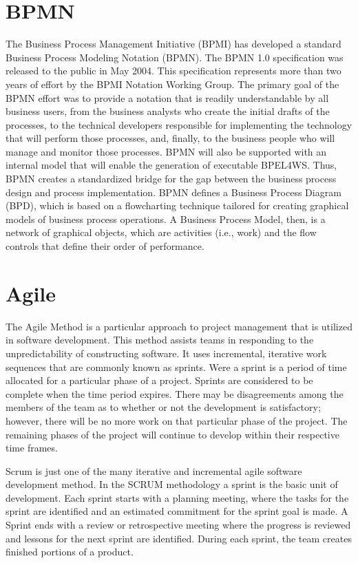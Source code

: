 \section{BPMN}
The Business Process Management Initiative (BPMI) has developed a standard
Business Process Modeling Notation (BPMN). The BPMN 1.0 specification was
released to the public in May 2004. This specification represents more than two
years of effort by the BPMI Notation Working Group. The primary goal of the BPMN
effort was to provide a notation that is readily understandable by all business
users, from the business analysts who create the initial drafts of the
processes, to the technical developers responsible for implementing the
technology that will perform those processes, and, finally, to the business
people who will manage and monitor those processes. BPMN will also be supported
with an internal model that will enable the generation of executable BPEL4WS.
Thus, BPMN creates a standardized bridge for the gap between the business
process design and process implementation.
BPMN defines a Business Process Diagram (BPD), which is based on a flowcharting
technique tailored for creating graphical models of business process operations.
A Business Process Model, then, is a network of graphical objects, which are
activities (i.e., work) and the flow controls that define their order of
performance.


\section{Agile}
The Agile Method is a particular approach to project management that is utilized
in software development. This method assists teams in responding to the
unpredictability of constructing software. It uses incremental, iterative work
sequences that are commonly known as sprints. Were a sprint is a period of time
allocated for a particular phase of a project. Sprints are considered to be
complete when the time period expires. There may be disagreements among the
members of the team as to whether or not the development is satisfactory;
however, there will be no more work on that particular phase of the project. The
remaining phases of the project will continue to develop within their respective
time frames.

Scrum is just one of the many iterative and incremental agile software
development method. In the SCRUM methodology a sprint is the basic unit of
development. Each sprint starts with a planning meeting, where the tasks for the
sprint are identified and an estimated commitment for the sprint goal is made. A
Sprint ends with a review or retrospective meeting where the progress is
reviewed and lessons for the next sprint are identified. During each sprint, the
team creates finished portions of a product.

